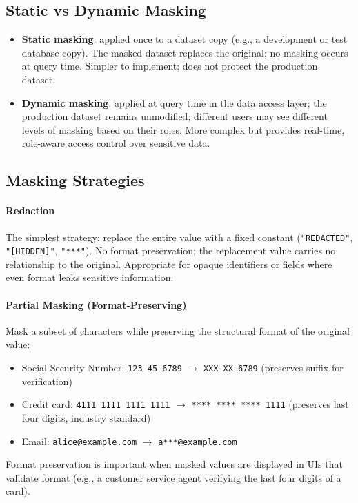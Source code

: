 \subsection{Static vs Dynamic Masking}

\begin{itemize}
    \item \textbf{Static masking}: applied once to a dataset copy (e.g., a development or test database copy). The masked dataset replaces the original; no masking occurs at query time. Simpler to implement; does not protect the production dataset.
    \item \textbf{Dynamic masking}: applied at query time in the data access layer; the production dataset remains unmodified; different users may see different levels of masking based on their roles. More complex but provides real-time, role-aware access control over sensitive data.
\end{itemize}

\subsection{Masking Strategies}

\paragraph{Redaction}

The simplest strategy: replace the entire value with a fixed constant (\texttt{"REDACTED"}, \texttt{"[HIDDEN]"}, \texttt{"***"}). No format preservation; the replacement value carries no relationship to the original. Appropriate for opaque identifiers or fields where even format leaks sensitive information.

\paragraph{Partial Masking (Format-Preserving)}

Mask a subset of characters while preserving the structural format of the original value:
\begin{itemize}
    \item Social Security Number: \texttt{123-45-6789} $\to$ \texttt{XXX-XX-6789} (preserves suffix for verification)
    \item Credit card: \texttt{4111 1111 1111 1111} $\to$ \texttt{**** **** **** 1111} (preserves last four digits, industry standard)
    \item Email: \texttt{alice@example.com} $\to$ \texttt{a***@example.com}
\end{itemize}
Format preservation is important when masked values are displayed in UIs that validate format (e.g., a customer service agent verifying the last four digits of a card).

